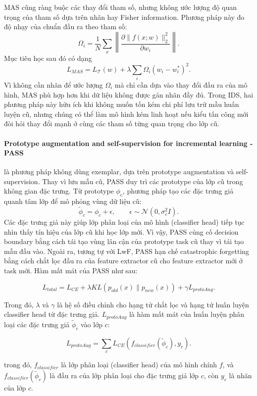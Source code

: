 MAS cũng ràng buộc các thay đổi tham số, nhưng không ước lượng độ quan trọng của tham số dựa trên nhãn hay Fisher information. Phương pháp này đo độ nhạy của chuẩn đầu ra theo tham số:
$$
\Omega_i=\frac{1}{N}\sum_{x}\left\|\frac{\partial \|f(x;w)\|_2^2}{\partial w_i}\right\|.
$$
Mục tiêu học sau đó có dạng
$$
L_{MAS}=L_{\mathcal{T}}(w)+\lambda\sum_i \Omega_i(w_i-w_i^*)^2.
$$
Vì không cần nhãn để ước lượng $\Omega_i$ mà chỉ cần dựa vào thay đổi đầu ra của mô hình, MAS phù hợp hơn khi dữ liệu không được gán nhãn đầy đủ. Trong IDS, hai phương pháp này hữu ích khi không muốn tốn kém chi phí lưu trữ mẫu huấn luyện cũ, nhưng chúng có thể làm mô hình kém linh hoạt nếu kiểu tấn công mới đòi hỏi thay đổi mạnh ở cùng các tham số từng quan trọng cho lớp cũ.

\paragraph{Prototype augmentation and self-supervision for incremental learning - PASS} \cite{zhu2021pass} là phương pháp không dùng exemplar, dựa trên prototype augmentation và self-supervision. Thay vì lưu mẫu cũ, PASS duy trì các prototype của lớp cũ trong không gian đặc trưng. Từ prototype $\phi_c$, phương pháp tạo các đặc trưng giả quanh tâm lớp để mô phỏng vùng dữ liệu cũ:
$$
\tilde \phi_c=\phi_c+\epsilon,\qquad \epsilon\sim\mathcal{N}(0,\sigma_c^2 I).
$$
Các đặc trưng giả này  giúp lớp phân loại của mô hình (classifier head) tiếp tục nhìn thấy tín hiệu của lớp cũ khi học lớp mới. Vì vậy, PASS củng cố decision boundary bằng cách tái tạo vùng lân cận của prototype task cũ thay vì tái tạo mẫu đầu vào. Ngoài ra, tương tự với LwF, PASS hạn chế catastrophic forgetting bằng cách chắt lọc đầu ra của feature extractor cũ cho feature extractor mới ở task mới. Hàm mất mát của PASS như sau:

$$
L_{total} = L_{CE} + \lambda KL(p_{old}(x)\|p_{new}(x)) + \gamma L_{protoAug}.
$$

Trong đó, $\lambda$ và $\gamma$ là hệ số điều chỉnh cho hạng tử chắt lọc và hạng tử huấn luyện classifier head từ đặc trưng giả. $L_{protoAug}$ là hàm mất mát của huấn luyện phân loại các đặc trưng giả $\tilde \phi_c$ vào lớp $c$:

$$
L_{protoAug} = \sum_c L_{CE}(f_{classifier}(\tilde \phi_c), y_c).
$$

trong đó, $f_{classifier}$ là lớp phân loại (classifier head) của mô hình chính $f$, và $f_{classifier}(\tilde \phi_c)$ là đầu ra của lớp phân loại cho đặc trưng giả lớp $c$, còn $y_c$ là nhãn của lớp $c$.

